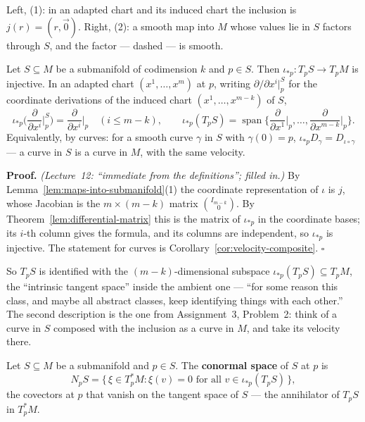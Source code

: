 \documentclass[11pt]{report}
\makeatletter
\newcounter{defcounter}[section]
\newcounter{thmcounter}[section]
\renewenvironment{proof}[1][Proof]{\noindent\textbf{#1.} }{\hfill$\square$\par\vspace{5pt}}
\newcommand{\thmlabel}[1]{\edef\@currentlabel{\arabic{section}.\arabic{thmcounter}}\label{#1}}
\newcommand{\deflabel}[1]{\edef\@currentlabel{\arabic{section}.\arabic{defcounter}}\label{#1}}
\DeclareMathOperator{\Span}{span}
\newcommand{\leeref}[1]{\par\smallskip{\raggedleft\footnotesize\textsc{Lee}:\ #1\par}}
\makeatother
\begin{document}
Left, (1): in an adapted chart and its induced chart the inclusion is $j(r) = (r, \vec 0)$. Right, (2): a smooth map into $M$ whose values lie in $S$ factors through $S$, and the factor --- dashed --- is smooth.

\begin{propbox}\thmlabel{prop:submanifold-tangent}
Let $S \subseteq M$ be a submanifold of codimension $k$ and $p \in S$. Then $\iota_{*p} : T_pS \to T_pM$ is injective. In an adapted chart $(x^1, \ldots, x^m)$ at $p$, writing $\partial/\partial x^i|^S_p$ for the coordinate derivations of the induced chart $(x^1, \ldots, x^{m-k})$ of $S$,
\[
\iota_{*p}\Big(\frac{\partial}{\partial x^i}\Big|^S_p\Big) = \frac{\partial}{\partial x^i}\Big|_p \quad (i \le m - k), \qquad \iota_{*p}(T_pS) = \Span\Big\{\frac{\partial}{\partial x^1}\Big|_p, \ldots, \frac{\partial}{\partial x^{m-k}}\Big|_p\Big\}.
\]
Equivalently, by curves: for a smooth curve $\gamma$ in $S$ with $\gamma(0) = p$, $\iota_{*p} D_\gamma = D_{\iota \circ \gamma}$ --- a curve in $S$ is a curve in $M$, with the same velocity.
\leeref{Propositions 5.35 and 5.37}
\end{propbox}

\begin{proof}
\textit{(Lecture~12: ``immediate from the definitions''; filled in.)} By Lemma~\ref{lem:maps-into-submanifold}(1) the coordinate representation of $\iota$ is $j$, whose Jacobian is the $m \times (m-k)$ matrix $\binom{I_{m-k}}{0}$. By Theorem~\ref{lem:differential-matrix} this is the matrix of $\iota_{*p}$ in the coordinate bases; its $i$-th column gives the formula, and its columns are independent, so $\iota_{*p}$ is injective. The statement for curves is Corollary~\ref{cor:velocity-composite}.
\end{proof}

So $T_pS$ is identified with the $(m-k)$-dimensional subspace $\iota_{*p}(T_pS) \subseteq T_pM$, the ``intrinsic tangent space'' inside the ambient one --- ``for some reason this class, and maybe all abstract classes, keep identifying things with each other.'' The second description is the one from Assignment~3, Problem~2: think of a curve in $S$ composed with the inclusion as a curve in $M$, and take its velocity there.

\begin{defbox}\deflabel{def:conormal}
Let $S \subseteq M$ be a submanifold and $p \in S$. The \textbf{conormal space} of $S$ at $p$ is
\[
N_pS = \{\, \xi \in T_p^*M : \xi(v) = 0 \text{ for all } v \in \iota_{*p}(T_pS) \,\},
\]
the covectors at $p$ that vanish on the tangent space of $S$ --- the annihilator of $T_pS$ in $T_p^*M$.
\end{defbox}
\end{document}
